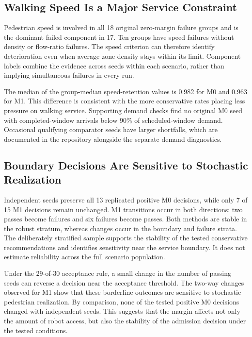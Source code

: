 \documentclass[NewProceedings,letterpaper]{ascelike-new}
\begin{document}
\begin{table}[!htbp]
\centering\caption{Core allocation rules on 164 scenarios. Utilization uses all 139 positive-reference scenarios, including zero admission.}
\label{tab:methods}\small\setlength{\tabcolsep}{6pt}

\end{table}

\subsection{Walking Speed Is a Major Service Constraint}
Pedestrian speed is involved in all 18 original zero-margin failure groups and is the dominant failed component in 17. Ten groups have speed failures without density or flow-ratio failures. The speed criterion can therefore identify deterioration even when average zone density stays within its limit. Component labels combine the evidence across seeds within each scenario, rather than implying simultaneous failures in every run.

The median of the group-median speed-retention values is 0.982 for M0 and 0.963 for M1. This difference is consistent with the more conservative rates placing less pressure on walking service. Supporting demand checks find no original M0 seed with completed-window arrivals below 90\% of scheduled-window demand. Occasional qualifying comparator seeds have larger shortfalls, which are documented in the repository alongside the separate demand diagnostics.

\subsection{Boundary Decisions Are Sensitive to Stochastic Realization}
Independent seeds preserve all 13 replicated positive M0 decisions, while only 7 of 15 M1 decisions remain unchanged. M1 transitions occur in both directions: two passes become failures and six failures become passes. Both methods are stable in the robust stratum, whereas changes occur in the boundary and failure strata. The deliberately stratified sample supports the stability of the tested conservative recommendations and identifies sensitivity near the service boundary. It does not estimate reliability across the full scenario population.

Under the 29-of-30 acceptance rule, a small change in the number of passing seeds can reverse a decision near the acceptance threshold. The two-way changes observed for M1 show that these borderline outcomes are sensitive to stochastic pedestrian realization. By comparison, none of the tested positive M0 decisions changed with independent seeds. This suggests that the margin affects not only the amount of robot access, but also the stability of the admission decision under the tested conditions.
\end{document}
